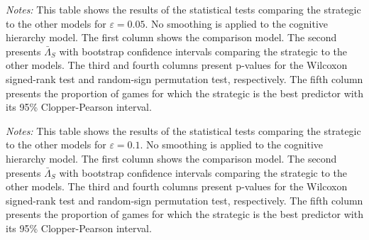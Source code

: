 \begin{table}[h!]
\begin{center}
\caption{Statistical tests comparing strategic  vs other models ($\varepsilon = 0.05$)} \label{tab:stat_bounds_05}
\scriptsize

\end{center}
\begin{footnotesize}
\begin{singlespace}
\vspace*{-0.05in}
\emph{Notes:} This table shows the results of the statistical tests comparing the strategic  to the other models for $\varepsilon = 0.05$.
No smoothing is applied to the cognitive hierarchy model.
The first column shows the comparison model.
The second presents $\bar \Lambda_S$ with bootstrap confidence intervals comparing the strategic  to the other models.
The third and fourth columns present p-values for the Wilcoxon signed-rank test and random-sign permutation test, respectively.
The fifth column presents the proportion of games for which the strategic  is the best predictor with its 95\% Clopper-Pearson interval. \starlanguage
\end{singlespace}
\end{footnotesize}
\end{table}

\begin{table}[h!]
\begin{center}
\caption{Statistical tests comparing optimized vs other models ($\varepsilon = 0.1$)} \label{tab:stat_bounds_10}
\scriptsize

\end{center}
\begin{footnotesize}
\begin{singlespace}
\vspace*{-0.05in}
\emph{Notes:} This table shows the results of the statistical tests comparing the strategic  to the other models for $\varepsilon = 0.1$.
No smoothing is applied to the cognitive hierarchy model.
The first column shows the comparison model.
The second presents $\bar \Lambda_S$ with bootstrap confidence intervals comparing the strategic  to the other models.
The third and fourth columns present p-values for the Wilcoxon signed-rank test and random-sign permutation test, respectively.
The fifth column presents the proportion of games for which the strategic  is the best predictor with its 95\% Clopper-Pearson interval. \starlanguage
\end{singlespace}
\end{footnotesize}
\end{table}


